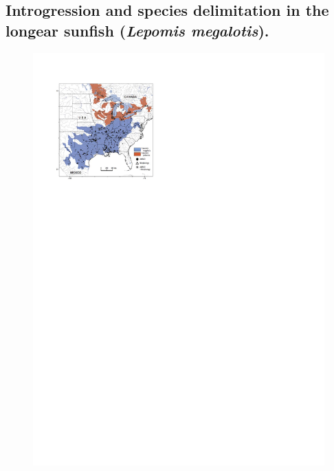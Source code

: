 \documentclass[A4]{article1}
\begin{document}
\subsection{Introgression and species delimitation in the longear sunfish (\textit{Lepomis
        megalotis}).}

\begin{figure}[t]
    \centering %
    \includegraphics[scale=0.4]{figs/fig-longear-fish-map}

\end{figure}
\end{document}
